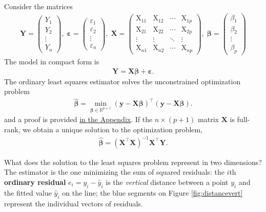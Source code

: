 \documentclass[
  11pt,
  letterpaper,
]{book}
\theoremstyle{definition}
\theoremstyle{definition}
\theoremstyle{definition}
\theoremstyle{remark}
\begin{document}
Consider the matrices
\begin{align*}
\boldsymbol{Y} =
 \begin{pmatrix}
  Y_1 \\
  Y_2 \\
  \vdots \\
  Y_n 
 \end{pmatrix} ,
 \;
 \boldsymbol{\varepsilon} =
 \begin{pmatrix}
  \varepsilon_1 \\
  \varepsilon_2 \\
  \vdots \\
  \varepsilon_n 
 \end{pmatrix} ,
 \;
\mathbf{X} = \begin{pmatrix}
\mathrm{X}_{11} & \mathrm{X}_{12} & \cdots & \mathrm{X}_{1p} \\
\mathrm{X}_{21} & \mathrm{X}_{22} & \cdots & \mathrm{X}_{2p} \\
\vdots & \vdots & \ddots & \vdots \\
\mathrm{X}_{n1} & \mathrm{X}_{n2} & \cdots & \mathrm{X}_{np} 
\end{pmatrix} , \;
\boldsymbol{\beta} =
 \begin{pmatrix}
  \beta_1 \\
  \beta_2 \\
  \vdots \\
  \beta_p 
 \end{pmatrix}
\end{align*}
The model in compact form is
\begin{align*}
\boldsymbol{Y} = \mathbf{X} \boldsymbol{\beta} + \boldsymbol{\varepsilon}.
\end{align*}
The ordinary least squares estimator solves the unconstrained optimization problem
\begin{align*}
\widehat{\boldsymbol{\beta}}=\min_{\boldsymbol{\beta} \in \mathbb{R}^{p+1}}(\boldsymbol{y}-\mathbf{X}\boldsymbol{\beta})^\top(\boldsymbol{y}-\mathbf{X}\boldsymbol{\beta}).
\end{align*}
and a proof is provided \protect\hyperlink{ols}{in the Appendix}. If the \(n \times (p+1)\) matrix \(\mathbf{X}\) is full-rank, we obtain a unique solution to the optimization problem,
\begin{align}
\widehat{\boldsymbol{\beta}} = (\mathbf{X}^{\top} \mathbf{X})^{-1} \mathbf{X}^{\top} \boldsymbol{Y}. \label{eq:ols}
\end{align}

What does the solution to the least squares problem represent in two dimensions? The estimator is the one minimizing the sum of squared residuals: the \(i\)th \textbf{ordinary residual} \(e_i = y_i -\widehat{y}_i\) is the \emph{vertical} distance between a point \(y_i\) and the fitted value \(\widehat{y}_i\) on the line; the blue segments on Figure \ref{fig:distancevert} represent the individual vectors of residuals.
\end{document}
